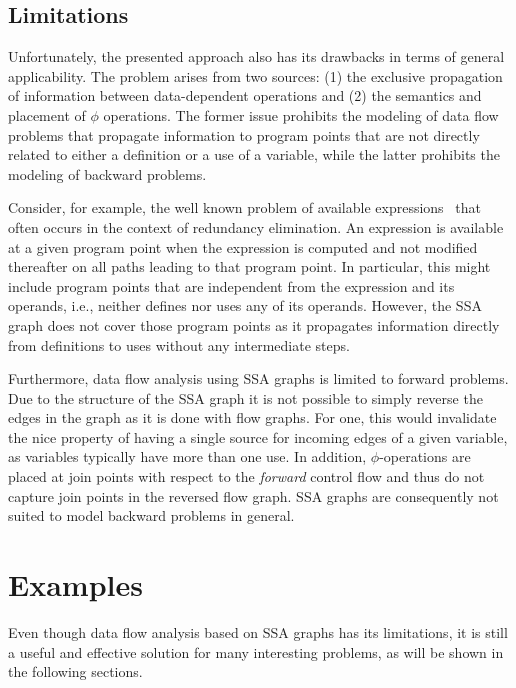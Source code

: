 \subsection{Limitations}

Unfortunately, the presented approach also has its drawbacks in terms of
general applicability. The problem arises from two sources: (1) the exclusive
propagation of information between data-dependent operations and (2) the
semantics and placement of $\phi$ operations. The former issue prohibits the
modeling of data flow problems that propagate information to program points that
are not directly related to either a definition or a use of a variable, while
the latter prohibits the modeling of backward problems.

Consider, for example, the well known problem of available
expressions~\cite{novillo:bib:NNH99} that often occurs in the context of
redundancy elimination. An expression is available at a given program point when
the expression is computed and not modified thereafter on all paths leading to
that program point. In particular, this might include program points that are
independent from the expression and its operands, i.e., neither defines nor uses
any of its operands. However, the SSA graph does not cover those program points
as it propagates information directly from definitions to uses without any
intermediate steps.

Furthermore, data flow analysis using SSA graphs is limited to forward problems.
Due to the structure of the SSA graph it is not possible to simply reverse the
edges in the graph as it is done with flow graphs. For one, this would
invalidate the nice property of having a single source for incoming edges of a
given variable, as variables typically have more than one use. In addition,
$\phi$-operations are placed at join points with respect to the \emph{forward}
control flow and thus do not capture join points in the reversed flow graph.
SSA graphs are consequently not suited to model backward problems in general.

\section{Examples}
\label{novillo:sec:examples}

Even though data flow analysis based on SSA graphs has its limitations, it is
still a useful and effective solution for many interesting problems, as will be
shown in the following sections.

